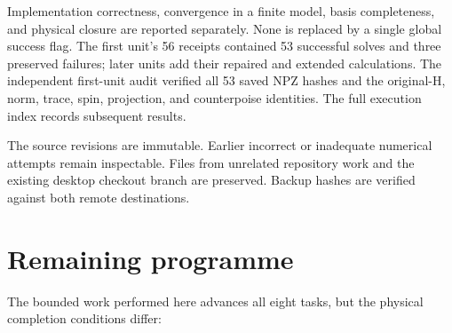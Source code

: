 \documentclass[
  10pt,
]{article}
\begin{document}
Implementation correctness, convergence in a finite model, basis
completeness, and physical closure are reported separately. None is
replaced by a single global success flag. The first unit's 56 receipts
contained 53 successful solves and three preserved failures; later units
add their repaired and extended calculations. The independent first-unit
audit verified all 53 saved NPZ hashes and the original-H, norm, trace,
spin, projection, and counterpoise identities. The full execution index
records subsequent results.

The source revisions are immutable. Earlier incorrect or inadequate
numerical attempts remain inspectable. Files from unrelated repository
work and the existing desktop checkout branch are preserved. Backup
hashes are verified against both remote destinations.

\hypertarget{remaining-programme}{%
\section{Remaining programme}\label{remaining-programme}}

The bounded work performed here advances all eight tasks, but the
physical completion conditions differ:
\end{document}
